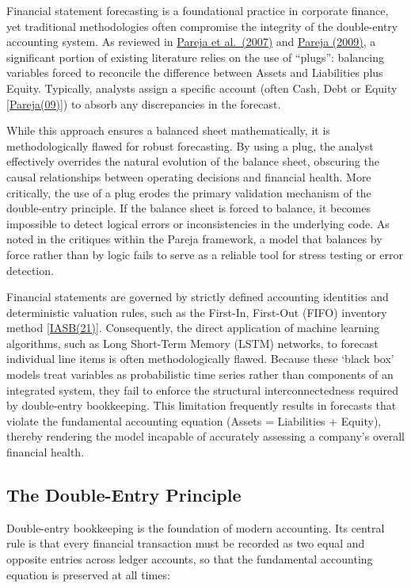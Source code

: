 \documentclass[12pt,a4paper]{article}
\begin{document}
Financial statement forecasting is a foundational practice in corporate
finance, yet traditional methodologies often compromise the integrity of
the double-entry accounting system. As reviewed in \hyperlink{ref:pareja07}{Pareja et al.\ (2007)}
and \hyperlink{ref:pareja09}{Pareja (2009)}, a significant portion of existing literature relies
on the use of ``plugs'': balancing variables forced to reconcile the
difference between Assets and Liabilities plus Equity. Typically,
analysts assign a specific account (often Cash, Debt or Equity
\hyperlink{ref:pareja09}{[Pareja(09)]}) to absorb any discrepancies in the forecast.

While this approach ensures a balanced sheet mathematically, it is
methodologically flawed for robust forecasting. By using a plug, the
analyst effectively overrides the natural evolution of the balance
sheet, obscuring the causal relationships between operating decisions
and financial health. More critically, the use of a plug erodes the
primary validation mechanism of the double-entry principle. If the
balance sheet is forced to balance, it becomes impossible to detect
logical errors or inconsistencies in the underlying code. As noted in
the critiques within the Pareja framework, a model that balances by
force rather than by logic fails to serve as a reliable tool for stress
testing or error detection.

Financial statements are governed by strictly defined accounting
identities and deterministic valuation rules, such as the First-In,
First-Out (FIFO) inventory method \hyperlink{ref:iasb21}{[IASB(21)]}. Consequently, the
direct application of machine learning algorithms, such as Long
Short-Term Memory (LSTM) networks, to forecast individual line items is
often methodologically flawed. Because these `black
box' models treat variables as probabilistic time
series rather than components of an integrated system, they fail to
enforce the structural interconnectedness required by double-entry
bookkeeping. This limitation frequently results in forecasts that
violate the fundamental accounting equation (Assets = Liabilities +
Equity), thereby rendering the model incapable of accurately assessing a
company's overall financial health.

\subsection{The Double-Entry Principle}
\label{sec:double-entry}

Double-entry bookkeeping is the foundation of modern accounting. Its
central rule is that every financial transaction must be recorded as two
equal and opposite entries across ledger accounts, so that the fundamental
accounting equation is preserved at all times:
\end{document}
